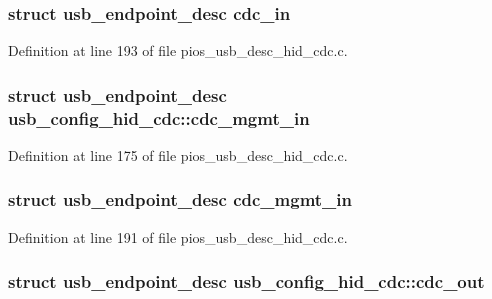 \hypertarget{group___p_i_o_s___u_s_b___d_e_s_c_ga45cebf693381151be1d05f36c5ef2555}{
\subsubsection[{cdc\-\_\-in}]{\setlength{\rightskip}{0pt plus 5cm}struct {\bf usb\-\_\-endpoint\-\_\-desc} cdc\-\_\-in}}\label{group___p_i_o_s___u_s_b___d_e_s_c_ga45cebf693381151be1d05f36c5ef2555}


Definition at line 193 of file pios\-\_\-usb\-\_\-desc\-\_\-hid\-\_\-cdc.\-c.

\hypertarget{group___p_i_o_s___u_s_b___d_e_s_c_gae83909d6ab80cf2e1ce3ecd22d1dc9ec}{
\subsubsection[{cdc\-\_\-mgmt\-\_\-in}]{\setlength{\rightskip}{0pt plus 5cm}struct {\bf usb\-\_\-endpoint\-\_\-desc} usb\-\_\-config\-\_\-hid\-\_\-cdc\-::cdc\-\_\-mgmt\-\_\-in}}\label{group___p_i_o_s___u_s_b___d_e_s_c_gae83909d6ab80cf2e1ce3ecd22d1dc9ec}


Definition at line 175 of file pios\-\_\-usb\-\_\-desc\-\_\-hid\-\_\-cdc.\-c.

\hypertarget{group___p_i_o_s___u_s_b___d_e_s_c_ga712d76be7f3a64d87d05fabc10e2686e}{
\subsubsection[{cdc\-\_\-mgmt\-\_\-in}]{\setlength{\rightskip}{0pt plus 5cm}struct {\bf usb\-\_\-endpoint\-\_\-desc} cdc\-\_\-mgmt\-\_\-in}}\label{group___p_i_o_s___u_s_b___d_e_s_c_ga712d76be7f3a64d87d05fabc10e2686e}


Definition at line 191 of file pios\-\_\-usb\-\_\-desc\-\_\-hid\-\_\-cdc.\-c.

\hypertarget{group___p_i_o_s___u_s_b___d_e_s_c_ga38856efc6dd6e0466e9bfb7533992dc3}{
\subsubsection[{cdc\-\_\-out}]{\setlength{\rightskip}{0pt plus 5cm}struct {\bf usb\-\_\-endpoint\-\_\-desc} usb\-\_\-config\-\_\-hid\-\_\-cdc\-::cdc\-\_\-out}}\label{group___p_i_o_s___u_s_b___d_e_s_c_ga38856efc6dd6e0466e9bfb7533992dc3}


